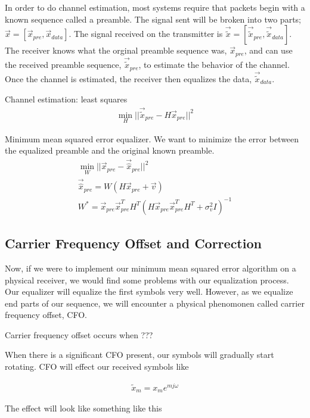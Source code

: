 In order to do channel estimation, most systems require that packets begin with a known sequence called a preamble. The signal sent will be broken into two parts; $\vec{x} = [\vec{x}_{pre}, \vec{x}_{data}]$.  The signal received on the transmitter is $\vec{\tilde{x}}=[\vec{\tilde{x}}_{pre},\vec{\tilde{x}}_{data}]$.  
The receiver knows what the orginal preamble sequence was, $\vec{x}_{pre}$, and can use the received preamble sequence, $\vec{\tilde{x}}_{pre}$, to estimate the behavior of the channel.
Once the channel is estimated, the receiver then equalizes the data, $\vec{\tilde{x}}_{data}$.

Channel estimation: least squares
\begin{align}
\min_H ||\vec{\tilde{x}}_{pre}-H\vec{x}_{pre}||^2
\end{align}

Minimum mean squared error equalizer.  We want to minimize the error between the equalized preamble and the original known preamble.  
\begin{align}
\min_W||\vec{x}_{pre}-\vec{\hat{x}}_{pre}||^2 \\
\vec{\hat{x}}_{pre} = W (H\vec{x}_{pre}+\vec{v}) \\
W^* = \vec{x}_{pre} \vec{x}_{pre}^T H^T (H \vec{x}_{pre} \vec{x}_{pre}^T H^T + \sigma_v^2 I)^{-1}
\end{align}

 
\subsection{Carrier Frequency Offset and Correction}

Now, if we were to implement our minimum mean squared error algorithm on a physical receiver, we would find some problems with our equalization process.  
Our equalizer will equalize the first symbols very well.  However, as we equalize end parts of our sequence, we will encounter a physical phenomonen called carrier frequency offset, CFO.

Carrier frequency offset occurs when ???

When there is a significant CFO present, our symbols will gradually start rotating. CFO will effect our received symbols like

\begin{align}
\tilde{x}_m = x_m e^{mj\omega}
\end{align}


The effect will look like something like this 

